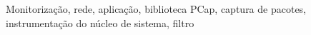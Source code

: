 

% 
% 
% 

\begin{keywords}
Monitorização, rede, aplicação, biblioteca PCap, captura de pacotes, instrumentação do núcleo de sistema, filtro
\end{keywords}
